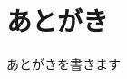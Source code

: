 \documentclass[index]{subfiles}
\begin{document}
  \chapter*{あとがき}
  \label{ch:epilogue}

  あとがきを書きます
\end{document}
